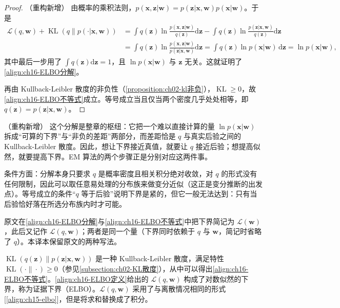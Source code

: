 \documentclass[../../main.tex]{subfiles}
\begin{document}
\begin{proof}（重构新增）
由概率的乘积法则，$p(\bm{x},\bm{z}|\bm{w})=p(\bm{z}|\bm{x},\bm{w})p(\bm{x}|\bm{w})$。于是
\begin{align*}
  \mathcal{L}(q,\bm{w})+\operatorname{KL}\left(q\|p(\cdot|\bm{x},\bm{w})\right)
  &=\int q(\bm{z})\ln\frac{p(\bm{x},\bm{z}|\bm{w})}{q(\bm{z})}\mathrm{d}\bm{z}-\int q(\bm{z})\ln\frac{p(\bm{z}|\bm{x},\bm{w})}{q(\bm{z})}\mathrm{d}\bm{z}\\
  &=\int q(\bm{z})\ln\frac{p(\bm{x},\bm{z}|\bm{w})}{p(\bm{z}|\bm{x},\bm{w})}\mathrm{d}\bm{z}
  =\int q(\bm{z})\ln p(\bm{x}|\bm{w})\,\mathrm{d}\bm{z}=\ln p(\bm{x}|\bm{w}),
\end{align*}
其中最后一步用了 $\int q(\bm{z})\mathrm{d}\bm{z}=1$，且 $\ln p(\bm{x}|\bm{w})$ 与 $\bm{z}$ 无关。这就证明了\eqref{align:ch16-ELBO分解}。

再由 Kullback-Leibler 散度的非负性（\cref{proposition:ch02-kl非负}），$\operatorname{KL}\geqslant0$，故\eqref{align:ch16-ELBO不等式}成立。等号成立当且仅当两个密度几乎处处相等，即 $q(\bm{z})=p(\bm{z}|\bm{x},\bm{w})$。
\end{proof}

\begin{remark}（重构新增）
这个分解是整章的枢纽：它把一个难以直接计算的量 $\ln p(\bm{x}|\bm{w})$ 拆成“可算的下界”与“非负的差距”两部分，而差距恰是 $q$ 与真实后验之间的 Kullback-Leibler 散度。因此，想让下界接近真值，就要让 $q$ 接近后验；想提高似然，就要提高下界。EM 算法的两个步骤正是分别对应这两件事。

条件方面：分解本身只要求 $q$ 是概率密度且相关积分绝对收敛，对 $q$ 的形式没有任何限制，因此可以取任意易处理的分布族来做变分近似（这正是变分推断的出发点）。等号成立的条件“$q$ 等于后验”说明下界是紧的，但它一般无法达到：只有当后验恰好落在所选分布族内时才可能。

原文在\eqref{align:ch16-ELBO分解}与\eqref{align:ch16-ELBO不等式}中把下界简记为 $\mathcal{L}(\bm{w})$，此后又记作 $\mathcal{L}(q,\bm{w})$；两者是同一个量（下界同时依赖于 $q$ 与 $\bm{w}$，简记时省略了 $q$）。本译本保留原文的两种写法。
\end{remark}

$\operatorname{KL}(q(\bm{z})\|p(\bm{z}|\bm{x},\bm{w}))$ 是一种 Kullback-Leibler 散度，满足特性 $\operatorname{KL}(\cdot\|\cdot)\geqslant0$（参见\cref{subsection:ch02-KL散度}），从中可以得出\eqref{align:ch16-ELBO不等式}。\eqref{align:ch16-ELBO定义}给出的 $\mathcal{L}(q,\bm{w})$ 构成了对数似然的下界，称为证据下界（ELBO）。$\mathcal{L}(q,\bm{w})$ 采用了与离散情况相同的形式[\eqref{align:ch15-elbo}]，但是将求和替换成了积分。
\end{document}
